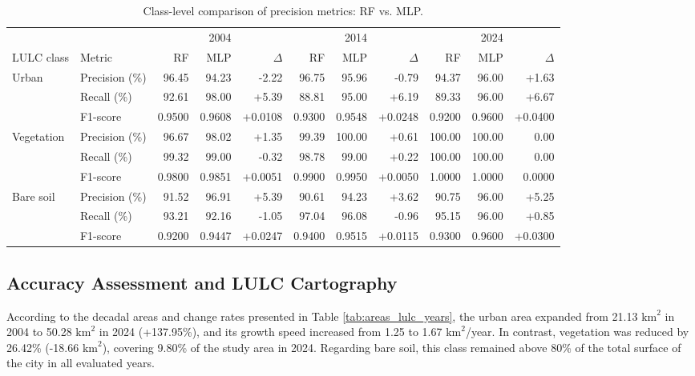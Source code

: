 \documentclass[runningheads]{llncs}
\begin{document}
\begin{table}[t]
\centering
\caption{Class-level comparison of precision metrics: RF vs. MLP.}
\label{tab:comparison_classes_rf_ann}
\small
\setlength{\tabcolsep}{5pt}
\begin{adjustbox}{max width=\textwidth}
\begin{tabular}{llrrrrrrrrr}
\hline
& & \multicolumn{3}{c}{2004} & \multicolumn{3}{c}{2014} & \multicolumn{3}{c}{2024} \\
LULC class & Metric & RF & MLP & $\Delta$ & RF & MLP & $\Delta$ & RF & MLP & $\Delta$ \\
\hline
Urban & Precision (\%) & 96.45 & 94.23 & -2.22 & 96.75 & 95.96 & -0.79 & 94.37 & 96.00 & +1.63 \\
       & Recall (\%)    & 92.61 & 98.00 & +5.39 & 88.81 & 95.00 & +6.19 & 89.33 & 96.00 & +6.67 \\
       & F1-score       & 0.9500 & 0.9608 & +0.0108 & 0.9300 & 0.9548 & +0.0248 & 0.9200 & 0.9600 & +0.0400 \\
\hline
Vegetation & Precision (\%) & 96.67 & 98.02 & +1.35 & 99.39 & 100.00 & +0.61 & 100.00 & 100.00 & 0.00 \\
           & Recall (\%)    & 99.32 & 99.00 & -0.32 & 98.78 & 99.00 & +0.22 & 100.00 & 100.00 & 0.00 \\
           & F1-score       & 0.9800 & 0.9851 & +0.0051 & 0.9900 & 0.9950 & +0.0050 & 1.0000 & 1.0000 & 0.0000 \\
\hline
Bare soil & Precision (\%) & 91.52 & 96.91 & +5.39 & 90.61 & 94.23 & +3.62 & 90.75 & 96.00 & +5.25 \\
          & Recall (\%)    & 93.21 & 92.16 & -1.05 & 97.04 & 96.08 & -0.96 & 95.15 & 96.00 & +0.85 \\
          & F1-score       & 0.9200 & 0.9447 & +0.0247 & 0.9400 & 0.9515 & +0.0115 & 0.9300 & 0.9600 & +0.0300 \\
\hline
\end{tabular}
\end{adjustbox}
\end{table}

\subsection{Accuracy Assessment and LULC Cartography}
\label{subsec:res_precision_cartografia}

According to the decadal areas and change rates presented in Table \ref{tab:areas_lulc_years}, the urban area expanded from 21.13 $\text{km}^2$ in 2004 to 50.28 $\text{km}^2$ in 2024 (+137.95\%), and its growth speed increased from 1.25 to 1.67 $\text{km}^2$/year. In contrast, vegetation was reduced by 26.42\% (-18.66 $\text{km}^2$), covering 9.80\% of the study area in 2024. Regarding bare soil, this class remained above 80\% of the total surface of the city in all evaluated years.
\end{document}
